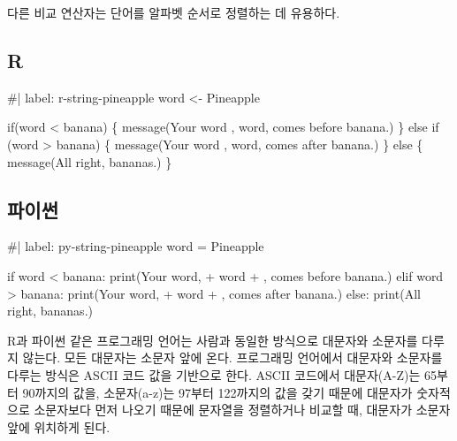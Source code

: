 \documentclass[
  letterpaper,
]{book}
\newenvironment{Shaded}{\begin{snugshade}}{\end{snugshade}}
\newcommand{\NormalTok}[1]{\textcolor[rgb]{0.00,0.23,0.31}{#1}}
\begin{document}
다른 비교 연산자는 단어를 알파벳 순서로 정렬하는 데 유용하다.

\subsection{R}

\begin{Shaded}
\begin{Highlighting}[]
\NormalTok{\#| label: r{-}string{-}pineapple}
\NormalTok{word \textless{}{-} \textquotesingle{}Pineapple\textquotesingle{}}

\NormalTok{if(word \textless{} \textquotesingle{}banana\textquotesingle{}) \{}
\NormalTok{  message(\textquotesingle{}Your word \textquotesingle{},  word, \textquotesingle{} comes before banana.\textquotesingle{})}
\NormalTok{\} else if (word \textgreater{} \textquotesingle{}banana\textquotesingle{}) \{}
\NormalTok{  message(\textquotesingle{}Your word \textquotesingle{}, word, \textquotesingle{} comes after banana.\textquotesingle{})}
\NormalTok{\} else \{}
\NormalTok{  message(\textquotesingle{}All right, bananas.\textquotesingle{})}
\NormalTok{\}}
\end{Highlighting}
\end{Shaded}

\subsection{파이썬}

\begin{Shaded}
\begin{Highlighting}[]
\NormalTok{\#| label: py{-}string{-}pineapple}
\NormalTok{word = \textquotesingle{}Pineapple\textquotesingle{}}

\NormalTok{if word \textless{} \textquotesingle{}banana\textquotesingle{}:}
\NormalTok{    print(\textquotesingle{}Your word, \textquotesingle{} + word + \textquotesingle{}, comes before banana.\textquotesingle{})}
\NormalTok{elif word \textgreater{} \textquotesingle{}banana\textquotesingle{}:}
\NormalTok{    print(\textquotesingle{}Your word, \textquotesingle{} + word + \textquotesingle{}, comes after banana.\textquotesingle{})}
\NormalTok{else:}
\NormalTok{    print(\textquotesingle{}All right, bananas.\textquotesingle{})}
\end{Highlighting}
\end{Shaded}

R과 파이썬 같은 프로그래밍 언어는 사람과 동일한 방식으로 대문자와
소문자를 다루지 않는다. 모든 대문자는 소문자 앞에 온다. 프로그래밍
언어에서 대문자와 소문자를 다루는 방식은 ASCII 코드 값을 기반으로 한다.
ASCII 코드에서 대문자(A-Z)는 65부터 90까지의 값을, 소문자(a-z)는 97부터
122까지의 값을 갖기 때문에 대문자가 숫자적으로 소문자보다 먼저 나오기
때문에 문자열을 정렬하거나 비교할 때, 대문자가 소문자 앞에 위치하게
된다.
\end{document}
